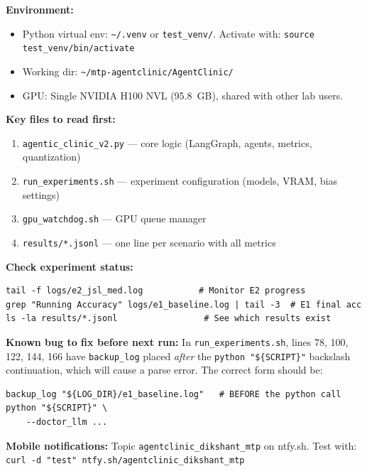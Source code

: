 \documentclass[12pt, a4paper]{article}
\begin{document}
\begin{tcolorbox}[colback=noteblue, colframe=iitblue, title=\textbf{If you are resuming this project as an AI agent, read this first}]

\textbf{Environment:}
\begin{itemize}
    \item Python virtual env: \texttt{\textasciitilde/.venv} or \texttt{test\_venv/}. Activate with: \texttt{source test\_venv/bin/activate}
    \item Working dir: \texttt{\textasciitilde/mtp-agentclinic/AgentClinic/}
    \item GPU: Single NVIDIA H100 NVL (95.8~GB), shared with other lab users.
\end{itemize}

\textbf{Key files to read first:}
\begin{enumerate}
    \item \texttt{agentic\_clinic\_v2.py} — core logic (LangGraph, agents, metrics, quantization)
    \item \texttt{run\_experiments.sh} — experiment configuration (models, VRAM, bias settings)
    \item \texttt{gpu\_watchdog.sh} — GPU queue manager
    \item \texttt{results/*.jsonl} — one line per scenario with all metrics
\end{enumerate}

\textbf{Check experiment status:}
\begin{lstlisting}[style=bashstyle]
tail -f logs/e2_jsl_med.log           # Monitor E2 progress
grep "Running Accuracy" logs/e1_baseline.log | tail -3  # E1 final acc
ls -la results/*.jsonl                 # See which results exist
\end{lstlisting}

\textbf{Known bug to fix before next run:} In \texttt{run\_experiments.sh}, lines 78, 100, 122, 144, 166 have \texttt{backup\_log} placed \textit{after} the \texttt{python "\$\{SCRIPT\}"} backslash continuation, which will cause a parse error. The correct form should be:
\begin{lstlisting}[style=bashstyle]
backup_log "${LOG_DIR}/e1_baseline.log"   # BEFORE the python call
python "${SCRIPT}" \
    --doctor_llm ...
\end{lstlisting}

\textbf{Mobile notifications:} Topic \texttt{agentclinic\_dikshant\_mtp} on ntfy.sh. Test with:
\texttt{curl -d "test" ntfy.sh/agentclinic\_dikshant\_mtp}
\end{tcolorbox}
\end{document}
